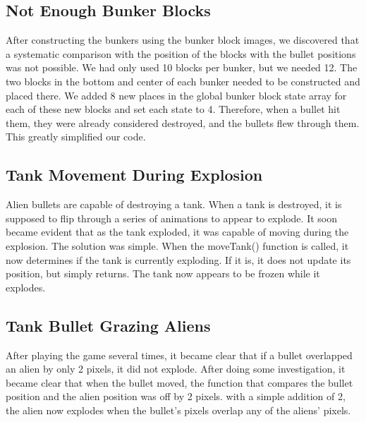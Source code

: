 \documentclass[11pt,letter,oneside]{report}
\begin{document}
\subsection{Not Enough Bunker Blocks}
After constructing the bunkers using the bunker block images, we discovered that a systematic comparison with the position of the blocks with the bullet positions was not possible. We had only used 10 blocks per bunker, but we needed 12. The two blocks in the bottom and center of each bunker needed to be constructed and placed there. We added 8 new places in the global bunker block state array for each of these new blocks and set each state to 4. Therefore, when a bullet hit them, they were already considered destroyed, and the bullets flew through them. This greatly simplified our code.

\subsection{Tank Movement During Explosion}
Alien bullets are capable of destroying a tank. When a tank is destroyed, it is supposed to flip through a series of animations to appear to explode. It soon became evident that as the tank exploded, it was capable of moving during the explosion. The solution was simple. When the moveTank() function is called, it now determines if the tank is currently exploding. If it is, it does not update its position, but simply returns. The tank now appears to be frozen while it explodes.

\subsection{Tank Bullet Grazing Aliens}
After playing the game several times, it became clear that if a bullet overlapped an alien by only 2 pixels, it did not explode. After doing some investigation, it became clear that when the bullet moved, the function that compares the bullet position and the alien position was off by 2 pixels. with a simple addition of 2, the alien now explodes when the bullet's pixels overlap any of the aliens' pixels.
\end{document}
